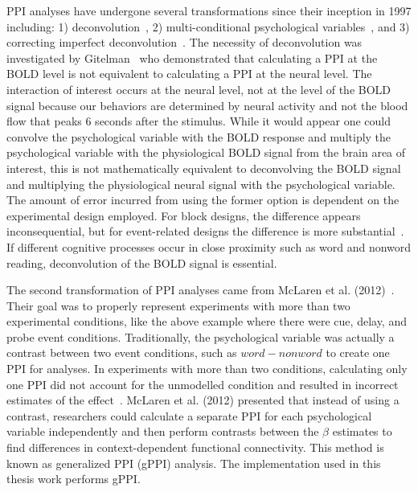 \documentclass[phd,figures,tables,ackpage,abstractpage,publicabstractpage]{uithesis}
\begin{document}
PPI analyses have undergone several transformations since their inception in 1997 including:
1) deconvolution~\cite{Gitelman2003}, 2) multi-conditional psychological variables~\cite{McLaren2012},
and 3) correcting imperfect deconvolution~\cite{Di2017}.
The necessity of deconvolution was investigated by Gitelman~\cite{Gitelman2003} who demonstrated
that calculating a PPI at the BOLD level is not equivalent to calculating
a PPI at the neural level.
The interaction of interest occurs at the neural level, not at the level of the BOLD signal
because our behaviors are determined by neural activity and not the blood flow that peaks 6 seconds
after the stimulus.
While it would appear one could convolve the psychological variable with the BOLD response and
multiply the psychological variable with the physiological BOLD signal from the brain area of interest,
this is not mathematically equivalent to deconvolving the BOLD signal and multiplying the physiological
neural signal with the psychological variable.
The amount of error incurred from using the former option is dependent on the experimental
design employed.
For block designs, the difference appears inconsequential, but for event-related designs
the difference is more substantial~\cite{Gitelman2003}.
If different cognitive processes occur in close proximity such as word and nonword
reading, deconvolution of the BOLD signal is essential.

The second transformation of PPI analyses came from McLaren et al. (2012)~\cite{McLaren2012}.
Their goal was to properly represent experiments with more than two experimental conditions, like
the above example where there were cue, delay, and probe event conditions.
Traditionally, the psychological variable was actually a contrast between two event conditions, such as
$word - nonword$ to create one PPI for analyses.
In experiments with more than two conditions, calculating only one PPI did not account
for the unmodelled condition and resulted in incorrect estimates of the effect~\cite{McLaren2012}.
McLaren et al. (2012) presented that instead of using a contrast, researchers could
calculate a separate PPI for each psychological variable independently and then
perform contrasts between the $\beta$ estimates to find differences in context-dependent functional connectivity.
This method is known as generalized PPI (gPPI) analysis.
The implementation used in this thesis work performs gPPI.
\end{document}
